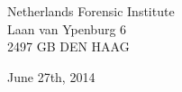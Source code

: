 \begin{titlepage}
\begin{addmargin}[-3cm]{-2cm}
\begin{center}
Netherlands Forensic Institute\\
Laan van Ypenburg 6 \\
2497 GB DEN HAAG 

\vspace{1.5cm}

June 27th, 2014

\end{center}
\end{addmargin}

\end{titlepage}
